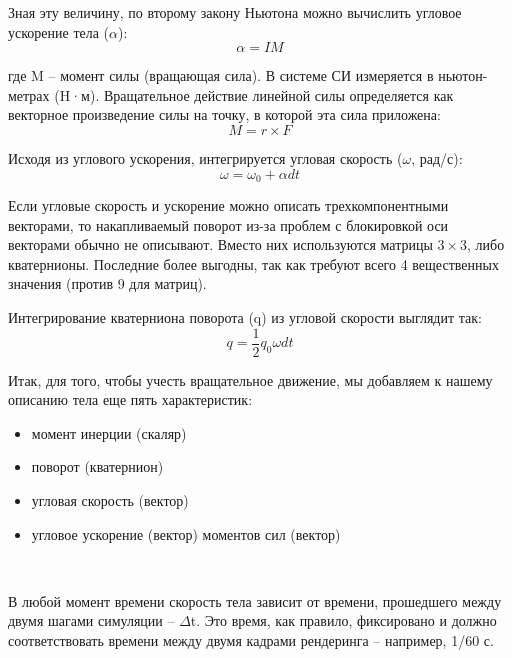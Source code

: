 Зная эту величину, по второму закону Ньютона можно 
вычислить угловое ускорение тела (\begin{math}\alpha\end{math}):
\begin{equation}
\alpha = IM
\end{equation}

где M – момент силы (вращающая сила). В системе СИ
измеряется в ньютон-метрах (H·м). Вращательное действие
линейной силы определяется как векторное произведение
силы на точку, в которой эта сила приложена:
\begin{equation}
M = r\times{F} 
\end{equation}

Исходя из углового ускорения, интегрируется угловая
скорость (\begin{math}\omega\end{math}, рад/с):
\begin{equation}
\omega = \omega_0 + \alpha{dt}
\end{equation}

Если угловые скорость и ускорение можно описать трехкомпонентными
векторами, то накапливаемый поворот из-за проблем с блокировкой оси
векторами обычно не описывают. Вместо них используются
матрицы \begin{math}3\times3\end{math}, либо кватернионы. Последние более выгодны, так
как требуют всего 4 вещественных значения (против 9 для
матриц).

Интегрирование кватерниона поворота (q) из угловой
скорости выглядит так:
\begin{equation}
q = \frac{1}{2}q_0\omega{dt}
\end{equation}

Итак, для того, чтобы учесть вращательное движение, мы
добавляем к нашему описанию тела еще пять характеристик:

\begin{itemize}
  \item момент инерции (скаляр)
  \item поворот (кватернион)
  \item угловая скорость (вектор)
  \item угловое ускорение (вектор)
   моментов сил (вектор)
\end{itemize}
\

В любой момент времени скорость тела зависит от
времени, прошедшего между двумя шагами симуляции – \begin{math}\Delta\end{math}t. Это
время, как правило, фиксировано и должно соответствовать
времени между двумя кадрами рендеринга – например, 1/60 с.

